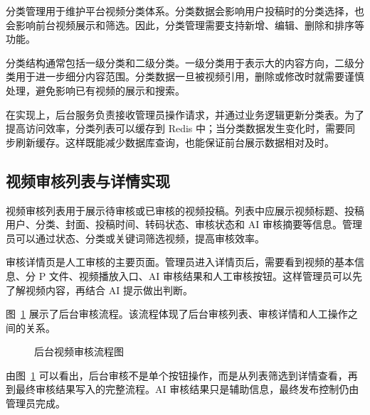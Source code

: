 分类管理用于维护平台视频分类体系。分类数据会影响用户投稿时的分类选择，也会影响前台视频展示和筛选。因此，分类管理需要支持新增、编辑、删除和排序等功能。

分类结构通常包括一级分类和二级分类。一级分类用于表示大的内容方向，二级分类用于进一步细分内容范围。分类数据一旦被视频引用，删除或修改时就需要谨慎处理，避免影响已有视频的展示和搜索。

在实现上，后台服务负责接收管理员操作请求，并通过业务逻辑更新分类表。为了提高访问效率，分类列表可以缓存到 Redis 中；当分类数据发生变化时，需要同步刷新缓存。这样既能减少数据库查询，也能保证前台展示数据相对及时。

\subsection{视频审核列表与详情实现}
\label{subsec:audit-list-detail-implementation}

视频审核列表用于展示待审核或已审核的视频投稿。列表中应展示视频标题、投稿用户、分类、封面、投稿时间、转码状态、审核状态和 AI 审核摘要等信息。管理员可以通过状态、分类或关键词筛选视频，提高审核效率。

审核详情页是人工审核的主要页面。管理员进入详情页后，需要看到视频的基本信息、分 P 文件、视频播放入口、AI 审核结果和人工审核按钮。这样管理员可以先了解视频内容，再结合 AI 提示做出判断。

图~\ref{fig:admin-audit-flow} 展示了后台审核流程。该流程体现了后台审核列表、审核详情和人工操作之间的关系。

\begin{figure}[htbp]
  \centering
  \caption{后台视频审核流程图}
  \label{fig:admin-audit-flow}
\end{figure}

由图~\ref{fig:admin-audit-flow} 可以看出，后台审核不是单个按钮操作，而是从列表筛选到详情查看，再到最终审核结果写入的完整流程。AI 审核结果只是辅助信息，最终发布控制仍由管理员完成。

